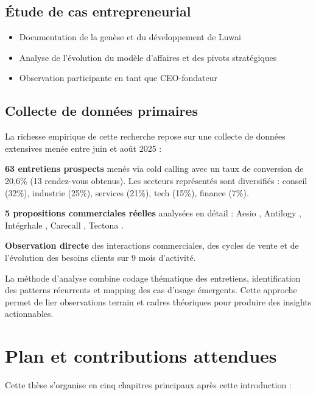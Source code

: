 \subsection{Étude de cas entrepreneurial}
\begin{itemize}
    \item Documentation de la genèse et du développement de Luwai
    \item Analyse de l'évolution du modèle d'affaires et des pivots stratégiques
    \item Observation participante en tant que CEO-fondateur
\end{itemize}

\subsection{Collecte de données primaires}
La richesse empirique de cette recherche repose sur une collecte de données extensives menée entre juin et août 2025 :

\textbf{63 entretiens prospects} menés via cold calling avec un taux de conversion de 20,6\% (13 rendez-vous obtenus). Les secteurs représentés sont diversifiés : conseil (32\%), industrie (25\%), services (21\%), tech (15\%), finance (7\%).

\textbf{5 propositions commerciales réelles} analysées en détail : Aesio \cite{luwai2025aesio}, Antilogy \cite{luwai2025antilogy}, Intégrhale \cite{luwai2025integrhale}, Carecall \cite{luwai2025carecall}, Tectona \cite{luwai2025tectona}.

\textbf{Observation directe} des interactions commerciales, des cycles de vente et de l'évolution des besoins clients sur 9 mois d'activité.

La méthode d'analyse combine codage thématique des entretiens, identification des patterns récurrents et mapping des cas d'usage émergents. Cette approche permet de lier observations terrain et cadres théoriques pour produire des insights actionnables.

\section{Plan et contributions attendues}

Cette thèse s'organise en cinq chapitres principaux après cette introduction :

